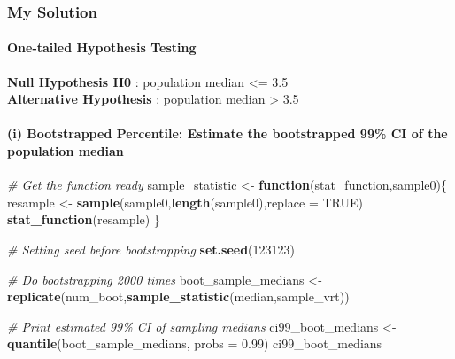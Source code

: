 \documentclass[
]{article}
\newenvironment{Shaded}{\begin{snugshade}}{\end{snugshade}}
\newcommand{\AttributeTok}[1]{\textcolor[rgb]{0.13,0.29,0.53}{#1}}
\newcommand{\CommentTok}[1]{\textcolor[rgb]{0.56,0.35,0.01}{\textit{#1}}}
\newcommand{\ConstantTok}[1]{\textcolor[rgb]{0.56,0.35,0.01}{#1}}
\newcommand{\ControlFlowTok}[1]{\textcolor[rgb]{0.13,0.29,0.53}{\textbf{#1}}}
\newcommand{\DecValTok}[1]{\textcolor[rgb]{0.00,0.00,0.81}{#1}}
\newcommand{\FloatTok}[1]{\textcolor[rgb]{0.00,0.00,0.81}{#1}}
\newcommand{\FunctionTok}[1]{\textcolor[rgb]{0.13,0.29,0.53}{\textbf{#1}}}
\newcommand{\NormalTok}[1]{#1}
\newcommand{\OtherTok}[1]{\textcolor[rgb]{0.56,0.35,0.01}{#1}}
\begin{document}
\hypertarget{my-solution-2}{%
\subsubsection{My Solution}\label{my-solution-2}}

\hypertarget{one-tailed-hypothesis-testing}{%
\paragraph{\texorpdfstring{\textbf{One-tailed Hypothesis
Testing}}{One-tailed Hypothesis Testing}}\label{one-tailed-hypothesis-testing}}

\textbf{Null Hypothesis H0} : population median \textless= 3.5\\
\textbf{Alternative Hypothesis} : population median \textgreater{} 3.5

\hypertarget{i-bootstrapped-percentile-estimate-the-bootstrapped-99-ci-of-the-population-median}{%
\paragraph{(i) Bootstrapped Percentile: Estimate the bootstrapped 99\%
CI of the population
median}\label{i-bootstrapped-percentile-estimate-the-bootstrapped-99-ci-of-the-population-median}}

\begin{Shaded}
\begin{Highlighting}[]
\CommentTok{\# Get the function ready}
\NormalTok{sample\_statistic }\OtherTok{\textless{}{-}} \ControlFlowTok{function}\NormalTok{(stat\_function,sample0)\{}
\NormalTok{  resample }\OtherTok{\textless{}{-}} \FunctionTok{sample}\NormalTok{(sample0,}\FunctionTok{length}\NormalTok{(sample0),}\AttributeTok{replace =} \ConstantTok{TRUE}\NormalTok{)}
  \FunctionTok{stat\_function}\NormalTok{(resample)}
\NormalTok{\}}

\CommentTok{\# Setting seed before bootstrapping}
\FunctionTok{set.seed}\NormalTok{(}\DecValTok{123123}\NormalTok{)}

\CommentTok{\# Do bootstrapping 2000 times}
\NormalTok{boot\_sample\_medians }\OtherTok{\textless{}{-}} \FunctionTok{replicate}\NormalTok{(num\_boot,}\FunctionTok{sample\_statistic}\NormalTok{(median,sample\_vrt))}

\CommentTok{\# Print estimated 99\% CI of sampling medians}
\NormalTok{ci99\_boot\_medians }\OtherTok{\textless{}{-}} \FunctionTok{quantile}\NormalTok{(boot\_sample\_medians, }\AttributeTok{probs =} \FloatTok{0.99}\NormalTok{)}
\NormalTok{ci99\_boot\_medians}
\end{Highlighting}
\end{Shaded}
\end{document}
